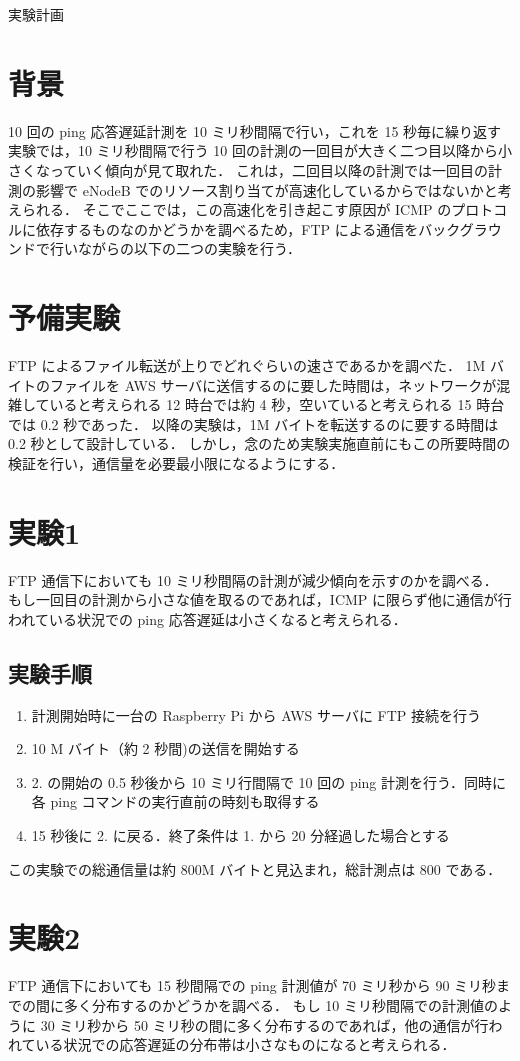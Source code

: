 \documentclass[a4j]{jarticle}
\begin{document}
\begin{center}
実験計画
\end{center}
\section{背景}
10 回の ping 応答遅延計測を 10 ミリ秒間隔で行い，これを 15 秒毎に繰り返す実験では，10 ミリ秒間隔で行う 10 回の計測の一回目が大きく二つ目以降から小さくなっていく傾向が見て取れた．
これは，二回目以降の計測では一回目の計測の影響で eNodeB でのリソース割り当てが高速化しているからではないかと考えられる．
そこでここでは，この高速化を引き起こす原因が ICMP のプロトコルに依存するものなのかどうかを調べるため，FTP による通信をバックグラウンドで行いながらの以下の二つの実験を行う．
\section{予備実験}
FTP によるファイル転送が上りでどれぐらいの速さであるかを調べた．
1M バイトのファイルを AWS サーバに送信するのに要した時間は，ネットワークが混雑していると考えられる 12 時台では約 4 秒，空いていると考えられる 15 時台では 0.2 秒であった．
以降の実験は，1M バイトを転送するのに要する時間は 0.2 秒として設計している．
しかし，念のため実験実施直前にもこの所要時間の検証を行い，通信量を必要最小限になるようにする．
\section{実験1}
FTP 通信下においても 10 ミリ秒間隔の計測が減少傾向を示すのかを調べる．
もし一回目の計測から小さな値を取るのであれば，ICMP に限らず他に通信が行われている状況での ping 応答遅延は小さくなると考えられる．
\subsection{実験手順}
\begin{enumerate}
\item 計測開始時に一台の Raspberry Pi から AWS サーバに FTP 接続を行う
\item 10 M バイト（約 2 秒間)の送信を開始する
\item 2. の開始の 0.5 秒後から 10 ミリ行間隔で 10 回の ping 計測を行う．同時に各 ping コマンドの実行直前の時刻も取得する
\item 15 秒後に 2. に戻る．終了条件は 1. から 20 分経過した場合とする
\end{enumerate}
この実験での総通信量は約 800M バイトと見込まれ，総計測点は 800 である．
\section{実験2}
FTP 通信下においても 15 秒間隔での ping 計測値が 70 ミリ秒から 90 ミリ秒までの間に多く分布するのかどうかを調べる．
もし 10 ミリ秒間隔での計測値のように 30 ミリ秒から 50 ミリ秒の間に多く分布するのであれば，他の通信が行われている状況での応答遅延の分布帯は小さなものになると考えられる．
\end{document}
